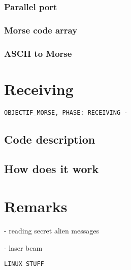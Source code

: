\documentclass[12pt]{report}
\begin{document}
\subsection{Parallel port}



\subsection{Morse code array}



\subsection{ASCII to Morse}


\newpage

\chapter{Receiving}

\verb|OBJECTIF_MORSE, PHASE: RECEIVING -|


\section{Code description}


\section{How does it work}


\chapter{Remarks}

- reading secret alien messages

- laser beam



\begin{snugshade}
\begin{verbatim}
LINUX STUFF
\end{verbatim}
\end{snugshade}


\begin{thebibliography}{50}

\end{thebibliography}
\end{document}
